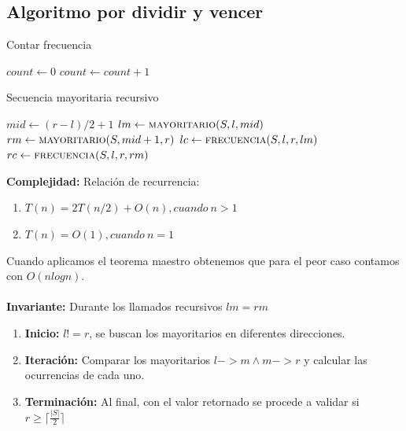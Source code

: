 \documentclass[]{article}
\begin{document}
\subsection{Algoritmo por dividir y vencer}
\begin{algorithm}[H]
    \caption{Contar frecuencia}
    \begin{algorithmic}[1]
        \State $count \gets 0$
        \State $count \gets count +1$
        \EndIf
        \EndFor
        \State {}
        \EndFunction
    \end{algorithmic}
\end{algorithm}
\begin{algorithm}[H]
    \caption{Secuencia mayoritaria recursivo}
    \begin{algorithmic}[1]
        \State {}
        \EndIf
        \State $mid \gets (r-l)/2 + 1$
        \State $lm \gets \Call{mayoritario}{S,l,mid}$
        \State $rm \gets \Call{mayoritario}{S,mid+1,r}$
        \State {}
        \EndIf
        \State $lc \gets \Call{frecuencia}{S,l,r,lm}$
        \State $rc \gets \Call{frecuencia}{S,l,r,rm}$
        \State {}
        \Else
        \State {}
        \EndIf
        \EndProcedure
    \end{algorithmic}
\end{algorithm}
\textbf{Complejidad:} Relación de recurrencia:
\begin{enumerate}
    \item $T(n) = 2 T(n/2) + O(n), cuando ~ n > 1$
    \item $T(n) = O(1), cuando~ n = 1$
\end{enumerate}
Cuando aplicamos el teorema maestro obtenemos que para el peor caso contamos con $O(nlogn)$.\\
\textbf{\\Invariante:}
Durante los llamados recursivos $lm=rm$
\begin{enumerate}
    \item \textbf{Inicio:}  $l  != r$,  se buscan los mayoritarios en diferentes direcciones.
    \item \textbf{Iteración:} Comparar los mayoritarios  $l->m \land  m->r$ y calcular las ocurrencias de cada uno.
    \item \textbf{Terminación:} Al final, con el valor retornado se procede a validar si $r \geq \lceil\frac{|S|}{2}\rceil$
\end{enumerate}
\end{document}
